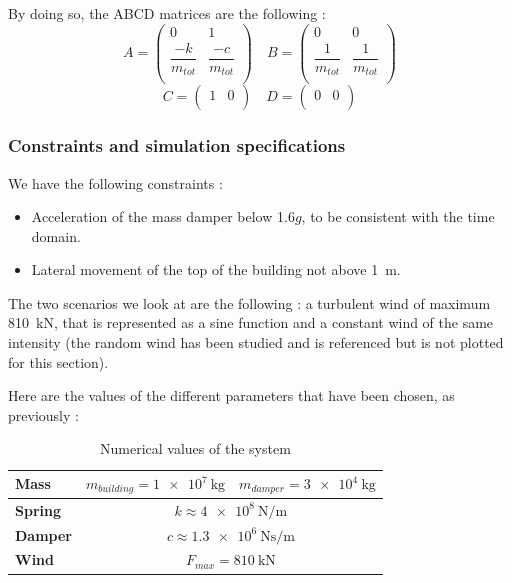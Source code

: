 By doing so, the ABCD matrices are the following :
$$
A = \begin{pmatrix}
    0 & 1\\
    \dfrac{-k}{m_{tot}} & \dfrac{-c}{m_{tot}}\\
\end{pmatrix}
\quad
B = \begin{pmatrix}
    0 & 0\\
    \dfrac{1}{m_{tot}} & \dfrac{1}{m_{tot}}\\
\end{pmatrix}
$$
$$
C = \begin{pmatrix}
    1 & 0\\
\end{pmatrix}
\quad
D = \begin{pmatrix}
    0 & 0\\
\end{pmatrix}
$$

\subsubsection{Constraints and simulation specifications}
We have the following constraints : 
\begin{itemize}
    \item Acceleration of the mass damper below \num{1.6}$g$, to be consistent with the time domain.
    \item Lateral movement of the top of the building not above \SI{1}{\meter}.
\end{itemize}
The two scenarios we look at are the following : a turbulent wind of maximum \SI{810}{\kilo\newton}, that is represented as a sine function and a constant wind of the same intensity (the random wind has been studied and is referenced but is not plotted for this section).\par
Here are the values of the different parameters that have been chosen, as previously : 
\begin{table}[H]
    \centering
    \begin{tabular}{|l|c|c|}
        \hline
        {\bf Mass} & $m_{building} = \SI{1e7}{\kilogram}$ & $m_{damper} = \SI{3e4}{\kilogram}$\\ \hline
        {\bf Spring} & \multicolumn{2}{c|}{$k\approx\SI{4e8}{\newton\per\meter}$}\\ \hline
        {\bf Damper} & \multicolumn{2}{c|}{$c\approx\SI{1.3e6}{\newton\second\per\meter}$}\\ \hline
        {\bf Wind} & \multicolumn{2}{c|}{$F_{max} = \SI{810}{\kilo\newton}$}\\ \hline
    \end{tabular}
    \caption{Numerical values of the system}
    \label{tab:numerical-values}
\end{table}

